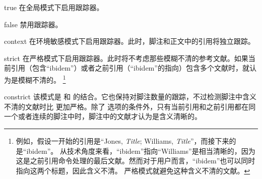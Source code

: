 \begin{optionlist}
\begin{valuelist}
\item[true] %
在全局模式下启用跟踪器。
\item[false] %
禁用跟踪器。
\item[context] %
在环境敏感模式下启用跟踪器。此时，脚注和正文中的引用将独立跟踪。
\item[strict] %
在严格模式下启用跟踪器。此时将不考虑那些模糊不清的参考文献。如果当前引用（包含“ibidem”）或者之前引用（“ibidem”的指向）包含多个文献时，就认为是模糊不清的。
\footnote{例如，假设一开始的引用是“Jones, \emph{Title}; Williams, \emph{Title}”，而接下来的是“ibidem”。
	从技术角度来看，“ibidem”指向“Williams”是相当清晰的，因为这是之前引用命令处理的最后文献。然而对于用户而言，“ibidem”也可以同时指向这两个标题，因此含义不清。	严格模式就避免这种含义不清的文献。}
\item[constrict] %
该模式是  和  的结合。它也保持对脚注数量的跟踪，不过检测脚注中含义不清的文献时比  更加严格。除了  选项的条件外，只有当前引用和之前引用都在同一个或者连续的脚注中时，脚注中的文献才认为是含义清晰的。
\end{valuelist}


\end{optionlist}
